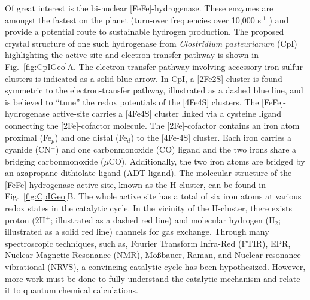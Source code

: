 Of great interest is the bi-nuclear [FeFe]-hydrogenase. \cite{PETERS20151350} These enzymes are amongst the fastest on the planet (turn-over frequencies over 10,000 s$^{\text{-1}}$ \cite{CatalyticTOF}) and provide a potential route to sustainable hydrogen production. The proposed crystal structure of one such hydrogenase from {\em Clostridium pasteurianum} (CpI) highlighting the active site and electron-transfer pathway is shown in Fig.~\ref{fig:CpIGeo}A. The electron-transfer pathway involving accessory iron-sulfur clusters is indicated as a solid blue arrow. In CpI, a [2Fe2S] cluster is found symmetric to the electron-transfer pathway, illustrated as a dashed blue line, and is believed to ``tune'' the redox potentials of the [4Fe4S] clusters. \cite{PetersPotentials} The [FeFe]-hydrogenase active-site carries a [4Fe4S] cluster linked via a cysteine ligand connecting the [2Fe]-cofactor molecule. The [2Fe]-cofactor contains an iron atom proximal (Fe$_p$) and one distal (Fe$_d$) to the [4Fe-4S] cluster. Each iron carries a cyanide (CN$^-$) and one carbonmonoxide (CO) ligand and the two irons share a bridging carbonmonoxide ($\mu$CO). Additionally, the two iron atoms are bridged by an azapropane-dithiolate-ligand (ADT-ligand). The molecular structure of the [FeFe]-hydrogenase active site, known as the H-cluster, can be found in Fig.~\ref{fig:CpIGeo}B. The whole active site has a total of six iron atoms at various redox states in the catalytic cycle. In the vicinity of the H-cluster, there exists proton (2H$^+$; illustrated as a dashed red line) and molecular hydrogen (H$_2$; illustrated as a solid red line) channels for gas exchange. Through many spectroscopic techniques, such as, Fourier Transform Infra-Red (FTIR), EPR, Nuclear Magnetic Resonance (NMR), M\"o\ss{}bauer, Raman, and Nuclear resonance vibrational (NRVS), a convincing catalytic cycle has been hypothesized. \cite{lubitzhyd, NRVS2017, sommer2017} However, more work must be done to fully understand the catalytic mechanism and relate it to quantum chemical calculations. 

